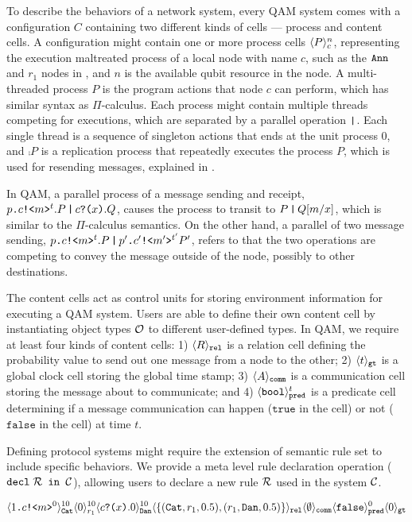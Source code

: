 To describe the behaviors of a network system, every QAM system comes with a configuration $C$
containing two different kinds of cells --- process and content cells.
A configuration might contain one or more process cells $\langle P \rangle^{n}_{c}$, representing the execution maltreated process of a local node with name $c$, such as the $\texttt{Ann}$ and $r_1$ nodes in ,
and $n$ is the available qubit resource in the node.
A multi-threaded process $P$ is the program actions that node $c$ can perform, which has similar syntax as $\Pi$-calculus.
Each process might contain multiple threads competing for executions, which are separated by a parallel operation $\texttt{|}$.
Each single thread is a sequence of singleton actions that ends at the unit process $0$,
and $\comp{P}$ is a replication process that repeatedly executes the process $P$, 
which is used for resending messages, explained in .

In QAM, a parallel process of a message sending and receipt, $p\texttt{.}c\texttt{!<}m\texttt{>}^t.P\,\texttt{|}\,c\texttt{?(}x\texttt{)}.Q$,
causes the process to transit to $P\,\texttt{|}\,Q[m/x]$, which is similar to the $\Pi$-calculus semantics.
On the other hand, a parallel of two message sending, $p\texttt{.}c\texttt{!<}m\texttt{>}^t.P\,\texttt{|}\,p'\texttt{.}c'\texttt{!<}m'\texttt{>}^{t'}{P'}$,
refers to that the two operations are competing to convey the message outside of the node, possibly to other destinations.

The content cells act as control units for storing environment information for executing a QAM system.
Users are able to define their own content cell by instantiating object types $\mathcal{O}$ to different user-defined types.
In QAM, we require at least four kinds of content cells: 
1) $\langle R \rangle_{\texttt{rel}}$ is a relation cell defining the probability value to send out one message from a node to the other;
2) $\langle t \rangle_{\texttt{gt}}$ is a global clock cell storing the global time stamp;
3) $\langle A \rangle_{\texttt{comm}}$ is a communication cell storing the message about to communicate;
and 4) $\langle \texttt{bool} \rangle^{t}_{\texttt{pred}}$ is a predicate cell 
determining if a message communication can happen ($\texttt{true}$ in the cell) or not ($\texttt{false}$ in the cell) at time $t$.

Defining protocol systems might require the extension of semantic rule set to include specific behaviors.
We provide a meta level rule declaration operation ($\texttt{decl}\;\mathcal{R}\texttt{ in }\mathcal{C}$), allowing users to declare a new rule $\mathcal{R}$ used in the system $\mathcal{C}$. 

{\footnotesize
\[
\langle 1\texttt{.}c\texttt{!<}m\texttt{>}^0 \rangle^{10}_{\texttt{Cat}}\langle 0 \rangle^{10}_{r_1}
\langle c\texttt{?(}x\texttt{)}.0 \rangle^{10}_{\texttt{Dan}} 
\langle \{(\texttt{Cat},r_1,0.5), (r_1,\texttt{Dan},0.5)\} \rangle_{\texttt{rel}}
\langle \emptyset \rangle_{\texttt{comm}}
\langle \texttt{false} \rangle^{0}_{\texttt{pred}}
\langle 0 \rangle_{\texttt{gt}}
\]
}

